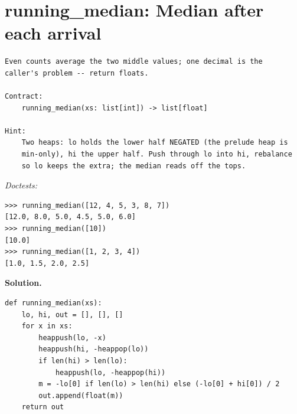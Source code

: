 \documentclass[11pt,letterpaper]{book}
\begin{document}
\section{running\_median: Median after each arrival}
\begin{lstlisting}[style=spec]
Even counts average the two middle values; one decimal is the
caller's problem -- return floats.

Contract:
    running_median(xs: list[int]) -> list[float]

Hint:
    Two heaps: lo holds the lower half NEGATED (the prelude heap is
    min-only), hi the upper half. Push through lo into hi, rebalance
    so lo keeps the extra; the median reads off the tops.
\end{lstlisting}
\noindent\textit{Doctests:}
\begin{lstlisting}[style=spec]
>>> running_median([12, 4, 5, 3, 8, 7])
[12.0, 8.0, 5.0, 4.5, 5.0, 6.0]
>>> running_median([10])
[10.0]
>>> running_median([1, 2, 3, 4])
[1.0, 1.5, 2.0, 2.5]
\end{lstlisting}
\noindent\textbf{Solution.}
\begin{lstlisting}[style=code]
def running_median(xs):
    lo, hi, out = [], [], []
    for x in xs:
        heappush(lo, -x)
        heappush(hi, -heappop(lo))
        if len(hi) > len(lo):
            heappush(lo, -heappop(hi))
        m = -lo[0] if len(lo) > len(hi) else (-lo[0] + hi[0]) / 2
        out.append(float(m))
    return out
\end{lstlisting}
\end{document}
